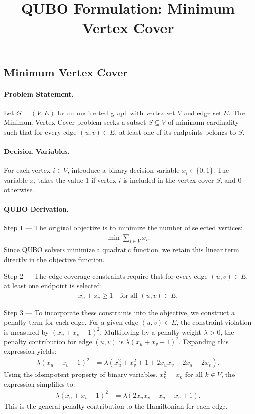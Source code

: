 \documentclass[12pt]{article}
\title{QUBO Formulation: Minimum Vertex Cover}
\date{}
\begin{document}
\maketitle

\subsection*{Minimum Vertex Cover}

\paragraph{Problem Statement.}
Let $G = (V, E)$ be an undirected graph with vertex set $V$ and edge set $E$. The Minimum Vertex Cover problem seeks a subset $S \subseteq V$ of minimum cardinality such that for every edge $(u, v) \in E$, at least one of its endpoints belongs to $S$.

\paragraph{Decision Variables.}
For each vertex $i \in V$, introduce a binary decision variable $x_i \in \{0, 1\}$. The variable $x_i$ takes the value $1$ if vertex $i$ is included in the vertex cover $S$, and $0$ otherwise.

\paragraph{QUBO Derivation.}
Step 1 --- The original objective is to minimize the number of selected vertices:
\begin{align}
\min \sum_{i \in V} x_i.
\end{align}
Since QUBO solvers minimize a quadratic function, we retain this linear term directly in the objective function.

Step 2 --- The edge coverage constraints require that for every edge $(u, v) \in E$, at least one endpoint is selected:
\begin{align}
x_u + x_v \ge 1 \quad \text{for all } (u, v) \in E.
\end{align}

Step 3 --- To incorporate these constraints into the objective, we construct a penalty term for each edge. For a given edge $(u, v) \in E$, the constraint violation is measured by $(x_u + x_v - 1)^2$. Multiplying by a penalty weight $\lambda > 0$, the penalty contribution for edge $(u, v)$ is $\lambda (x_u + x_v - 1)^2$. Expanding this expression yields:
\begin{align}
\lambda (x_u + x_v - 1)^2 &= \lambda (x_u^2 + x_v^2 + 1 + 2x_u x_v - 2x_u - 2x_v).
\end{align}
Using the idempotent property of binary variables, $x_k^2 = x_k$ for all $k \in V$, the expression simplifies to:
\begin{align}
\lambda (x_u + x_v - 1)^2 &= \lambda (2x_u x_v - x_u - x_v + 1).
\end{align}
This is the general penalty contribution to the Hamiltonian for each edge.
\end{document}
